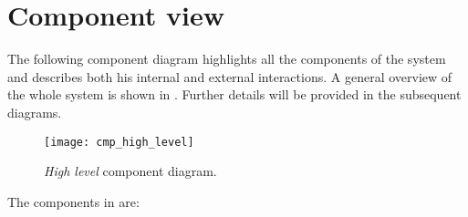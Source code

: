 \section{Component view}
The following component diagram highlights all the components of the system and describes both his internal and external interactions.
A general overview of the whole system is shown in . Further details will be provided in the subsequent diagrams.

\begin{figure}[H]
	\centering
	\texttt{[image: cmp\_high\_level]}
	\caption{\textit{High level} component diagram.}
	\label{fig:cmp_high_level}
\end{figure}

The components in  are:
